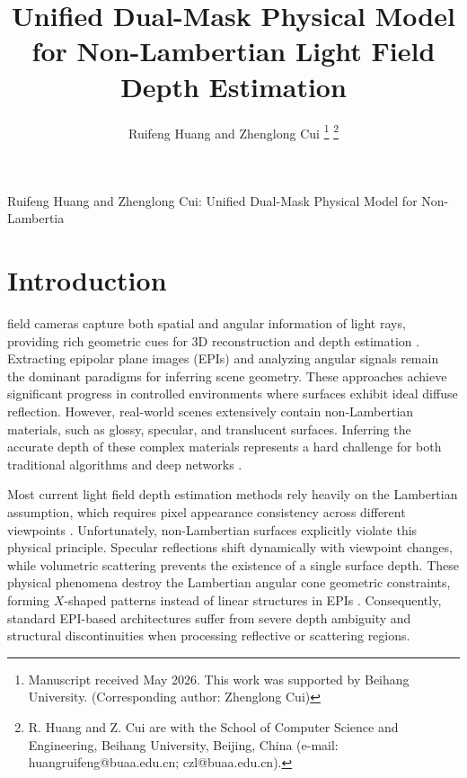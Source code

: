 \documentclass[lettersize,journal]{IEEEtran}
\begin{document}
\title{Unified Dual-Mask Physical Model for Non-Lambertian Light Field Depth Estimation}

\author{Ruifeng Huang and Zhenglong Cui
\thanks{Manuscript received May 2026. This work was supported by Beihang University. (Corresponding author: Zhenglong Cui)}
\thanks{R. Huang and Z. Cui are with the School of Computer Science and Engineering, Beihang University, Beijing, China (e-mail: huangruifeng@buaa.edu.cn; czl@buaa.edu.cn).}}

%
{Ruifeng Huang and Zhenglong Cui: Unified Dual-Mask Physical Model for Non-Lambertia}

\maketitle

\begin{abstract}

\end{abstract}

\begin{IEEEkeywords}

\end{IEEEkeywords}

\section{Introduction}

 field cameras capture both spatial and angular information of light rays, providing rich geometric cues for 3D reconstruction and depth estimation \cite{light_field_imaging, depth_estimation}. Extracting epipolar plane images (EPIs) and analyzing angular signals remain the dominant paradigms for inferring scene geometry. These approaches achieve significant progress in controlled environments where surfaces exhibit ideal diffuse reflection. However, real-world scenes extensively contain non-Lambertian materials, such as glossy, specular, and translucent surfaces. Inferring the accurate depth of these complex materials represents a hard challenge for both traditional algorithms and deep networks \cite{non_lambertian_surfaces, specular_reflection}.

Most current light field depth estimation methods rely heavily on the Lambertian assumption, which requires pixel appearance consistency across different viewpoints \cite{photo_consistency, lambertian_assumption}. Unfortunately, non-Lambertian surfaces explicitly violate this physical principle. Specular reflections shift dynamically with viewpoint changes, while volumetric scattering prevents the existence of a single surface depth. These physical phenomena destroy the Lambertian angular cone geometric constraints, forming $X$-shaped patterns instead of linear structures in EPIs \cite{epipolar_plane_image, geometric_constraints}. Consequently, standard EPI-based architectures suffer from severe depth ambiguity and structural discontinuities when processing reflective or scattering regions.
\end{document}
